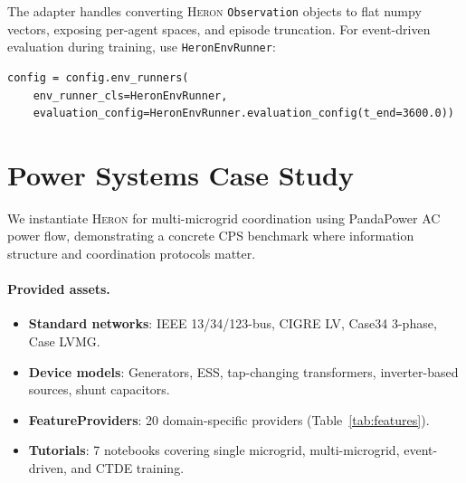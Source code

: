 \documentclass{article}
\newcommand{\heron}{\textsc{Heron}}
\begin{document}
The adapter handles converting \heron{} \texttt{Observation} objects to flat numpy vectors, exposing per-agent spaces, and episode truncation. For event-driven evaluation during training, use \texttt{HeronEnvRunner}:
\begin{lstlisting}
config = config.env_runners(
    env_runner_cls=HeronEnvRunner,
    evaluation_config=HeronEnvRunner.evaluation_config(t_end=3600.0))
\end{lstlisting}

\section{Power Systems Case Study}
\label{sec:power}

We instantiate \heron{} for multi-microgrid coordination using PandaPower AC power flow, demonstrating a concrete CPS benchmark where information structure and coordination protocols matter.

\paragraph{Provided assets.}
\begin{itemize}[nosep]
    \item \textbf{Standard networks}: IEEE 13/34/123-bus, CIGRE LV, Case34 3-phase, Case LVMG.
    \item \textbf{Device models}: Generators, ESS, tap-changing transformers, inverter-based sources, shunt capacitors.
    \item \textbf{FeatureProviders}: 20 domain-specific providers (Table~\ref{tab:features}).
    \item \textbf{Tutorials}: 7 notebooks covering single microgrid, multi-microgrid, event-driven, and CTDE training.
\end{itemize}
\end{document}
